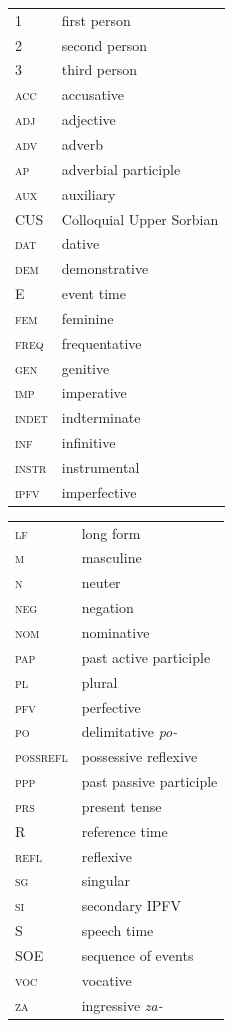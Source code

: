 \documentclass[output=paper,colorlinks,citecolor=brown]{langscibook}
\begin{document}
\begin{tabularx}{.5\textwidth}{@{}lQ}
\textsc{1}&first person\\
\textsc{2}&second person\\
\textsc{3}&third person\\
\textsc{acc}&accusative\\
\textsc{adj}&adjective\\
\textsc{adv}&adverb\\
\textsc{ap}&adverbial participle\\
\textsc{aux}&auxiliary\\
CUS&Colloquial Upper Sorbian\\
\textsc{dat}&dative\\
\textsc{dem}&demonstrative\\
E&event time\\
\textsc{fem}&feminine\\
\textsc{freq}&frequentative\\
\textsc{gen}&genitive\\
\textsc{imp}&imperative\\
\textsc{indet}&indterminate\\
\textsc{inf}&infinitive\\
\textsc{instr}&instrumental\\
\textsc{ipfv}&imperfective\\
\end{tabularx}%
\begin{tabularx}{.5\textwidth}{lQ@{}}
\textsc{lf}&long form\\
\textsc{m}&masculine\\
\textsc{n}&neuter\\
\textsc{neg}&negation\\
\textsc{nom}&nominative\\
\textsc{pap}&past active participle\\
\textsc{pl}&plural\\
\textsc{pfv}&perfective\\
\textsc{po}&delimitative \textit{po-}\\
\textsc{possrefl}&possessive reflexive\\
\textsc{ppp}&past passive participle\\
\textsc{prs}&present tense\\
R&reference time\\
\textsc{refl}&reflexive\\
\textsc{sg}&singular\\
\textsc{si}&secondary IPFV\\
S&speech time\\
SOE&sequence of events\\
\textsc{voc}&vocative\\
\textsc{za}&ingressive \textit{za-}\\
\end{tabularx}

\printbibliography[heading=subbibliography,notkeyword=this]
\end{document}
